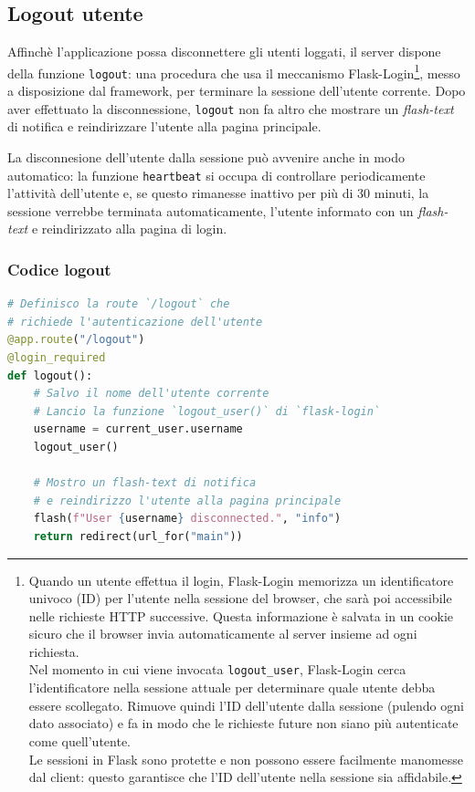 \documentclass[12pt]{report}
\newcommand{\http}{\textsf{HTTP}\xspace}
\begin{document}
\subsection{Logout utente}
Affinchè l'applicazione possa disconnettere gli utenti loggati, il server dispone della funzione \texttt{logout}: una procedura che usa il meccanismo \textsf{Flask-Login}\footnote{Quando un utente effettua il login, \textsf{Flask-Login} memorizza un identificatore univoco (\textsf{ID}) per l'utente nella sessione del browser, che sarà poi accessibile nelle richieste \http successive. Questa informazione è salvata in un cookie sicuro che il browser invia automaticamente al server insieme ad ogni richiesta.\\
Nel momento in cui viene invocata \texttt{logout\_user}, \textsf{Flask-Login} cerca l'identificatore nella sessione attuale per determinare quale utente debba essere scollegato. Rimuove quindi l'\textsf{ID} dell'utente dalla sessione (pulendo ogni dato associato) e fa in modo che le richieste future non siano più autenticate come quell'utente.\\
Le sessioni in Flask sono protette e non possono essere facilmente manomesse dal client: questo garantisce che l'\textsf{ID} dell'utente nella sessione sia affidabile.}, messo a disposizione dal framework, per terminare la sessione dell'utente corrente. Dopo aver effettuato la disconnessione, \texttt{logout} non fa altro che mostrare un \textit{flash-text} di notifica e reindirizzare l'utente alla pagina principale.

La disconnesione dell'utente dalla sessione può avvenire anche in modo automatico: la funzione \texttt{heartbeat} si occupa di controllare periodicamente l'attività dell'utente e, se questo rimanesse inattivo per più di 30 minuti, la sessione verrebbe terminata automaticamente, l'utente informato con un \textit{flash-text} e reindirizzato alla pagina di login.


\subsubsection{Codice logout}
\begin{lstlisting}[language=Python]
# Definisco la route `/logout` che
# richiede l'autenticazione dell'utente
@app.route("/logout")
@login_required
def logout():
    # Salvo il nome dell'utente corrente
    # Lancio la funzione `logout_user()` di `flask-login`
    username = current_user.username
    logout_user()

    # Mostro un flash-text di notifica
    # e reindirizzo l'utente alla pagina principale
    flash(f"User {username} disconnected.", "info")
    return redirect(url_for("main"))
\end{lstlisting}
\end{document}
